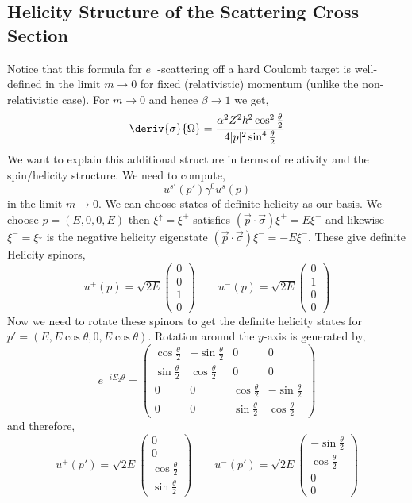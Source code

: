 \documentclass[12pt]{article}
\begin{document}
\subsection{Helicity Structure of the Scattering Cross Section}

Notice that this formula for $e^{-}$-scattering off a hard Coulomb target is well-defined in the limit $m \to 0$ for fixed (relativistic) momentum (unlike the non-relativistic case). For $m \to 0$ and hence $\beta \to 1$ we get,
\[ \deriv{\sigma}{\Omega} = \frac{\alpha^2 Z^2 \hbar^2 \cos^2{\frac{\theta}{2}}}{4 |p|^2 \sin^4{\frac{\theta}{2}}} \]
We want to explain this additional structure in terms of relativity and the spin/helicity structure. We need to compute,
\[ u^{s'}(p') \gamma^0 u^s(p) \]
in the limit $m \to 0$. We can choose states of definite helicity as our basis. We choose $p = (E, 0, 0, E)$ then $\xi^{\uparrow} = \xi^{+}$ satisfies $(\vec{p} \cdot \vec{\sigma}) \xi^{+} = E \xi^{+}$ and likewise $\xi^{-} = \xi^{\downarrow}$ is the negative helicity eigenstate $(\vec{p} \cdot \vec{\sigma}) \xi^{-} = - E \xi^{-}$. These give definite Helicity spinors,
\[ u^{+}(p) = \sqrt{2 E}
\begin{pmatrix}
0
\\
0
\\
1
\\
0
\end{pmatrix}
\quad \quad
u^{-}(p) = \sqrt{2 E}
\begin{pmatrix}
0
\\
1
\\
0
\\
0
\end{pmatrix}  \]
Now we need to rotate these spinors to get the definite helicity states for $p' = (E, E \cos{\theta}, 0, E \cos{\theta})$. Rotation around the $y$-axis is generated by,
\[ e^{-i \Sigma_2 \theta} =
\begin{pmatrix}
\cos{\tfrac{\theta}{2}} & - \sin{\tfrac{\theta}{2}} & 0 & 0
\\
\sin{\tfrac{\theta}{2}} & \cos{\tfrac{\theta}{2}} & 0 & 0
\\
0 & 0 & \cos{\tfrac{\theta}{2}} & - \sin{\tfrac{\theta}{2}}
\\
0 & 0 & \sin{\tfrac{\theta}{2}} & \cos{\tfrac{\theta}{2}}
\end{pmatrix} \] 
and therefore,
\[ u^{+}(p') = \sqrt{2 E}
\begin{pmatrix}
0
\\
0
\\
\cos{\tfrac{\theta}{2}}
\\
\sin{\tfrac{\theta}{2}}
\end{pmatrix}
\quad \quad
u^{-}(p') = \sqrt{2 E}
\begin{pmatrix}
- \sin{\tfrac{\theta}{2}}
\\
\cos{\tfrac{\theta}{2}}
\\
0
\\
0
\end{pmatrix}  \]
\end{document}

